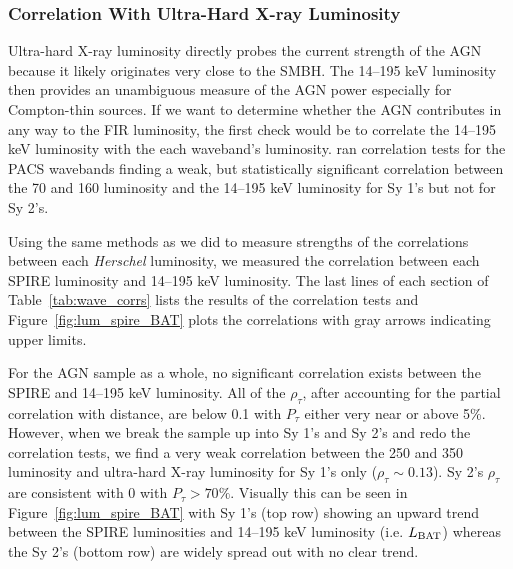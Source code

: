 \subsubsection{Correlation With Ultra-Hard X-ray Luminosity}
Ultra-hard X-ray luminosity directly probes the current strength of the AGN because it likely originates very close to the SMBH. The 14--195 keV luminosity then provides an unambiguous measure of the AGN power especially for Compton-thin sources. If we want to determine whether the AGN contributes in any way to the FIR luminosity, the first check would be to correlate the 14--195 keV luminosity with the each waveband's luminosity. \citet{Melendez:2014yu} ran correlation tests for the PACS wavebands finding a weak, but statistically significant correlation between the 70 and 160 \um{} luminosity and the 14--195 keV luminosity for Sy 1's but not for Sy 2's.

Using the same methods as we did to measure strengths of the correlations between each \textit{Herschel} luminosity, we measured the correlation between each SPIRE luminosity and 14--195 keV luminosity. The last lines of each section of Table~\ref{tab:wave_corrs} lists the results of the correlation tests and Figure~\ref{fig:lum_spire_BAT} plots the correlations with gray arrows indicating upper limits.

For the AGN sample as a whole, no significant correlation exists between the SPIRE and 14--195 keV luminosity. All of the $\rho_{\tau}$, after accounting for the partial correlation with distance, are below 0.1 with $P_{\tau}$ either very near or above 5\%. However, when we break the sample up into Sy 1's and Sy 2's and redo the correlation tests, we find a very weak correlation between the 250 and 350 \um{} luminosity and ultra-hard X-ray luminosity for Sy 1's only ($\rho_{\tau}\sim0.13$). Sy 2's $\rho_{\tau}$ are consistent with 0 with $P_{\tau}>70\%$. Visually this can be seen in Figure~\ref{fig:lum_spire_BAT} with Sy 1's (top row) showing an upward trend between the SPIRE luminosities and 14--195 keV luminosity (i.e. $L_{\rm BAT}$) whereas the Sy 2's (bottom row) are widely spread out with no clear trend.  